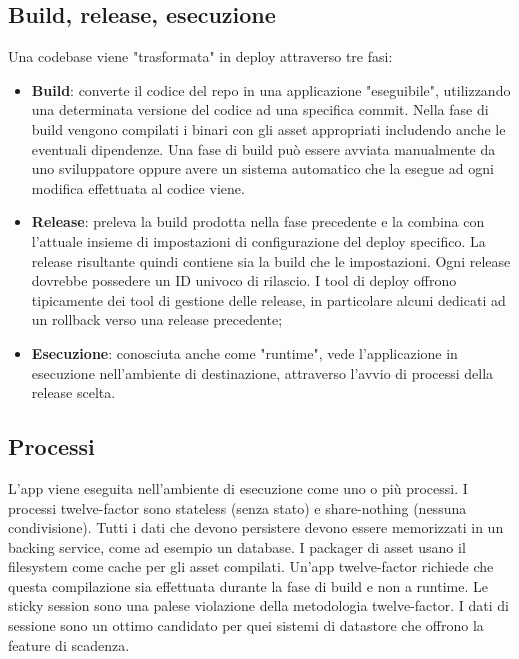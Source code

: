 \documentclass[PianoDiQualifica.tex]{subfiles}
\begin{document}
\subsection{Build, release, esecuzione}
Una codebase viene "trasformata" in deploy attraverso tre fasi:
\begin{itemize}
\item \textbf{Build}: converte il codice del repo in una applicazione "eseguibile", utilizzando una determinata versione del codice ad una specifica commit. Nella fase di build vengono compilati i binari con gli asset appropriati includendo anche le eventuali dipendenze. Una fase di build può essere avviata manualmente da uno sviluppatore oppure avere un sistema automatico che la esegue ad ogni modifica effettuata al codice viene.
\item \textbf{Release}: preleva la build prodotta nella fase precedente e la combina con l'attuale insieme di impostazioni di configurazione del deploy specifico. La release risultante quindi contiene sia la build che le impostazioni. Ogni release dovrebbe possedere un ID univoco di rilascio. I tool di deploy offrono tipicamente dei tool di gestione delle release, in particolare alcuni dedicati ad un rollback verso una release precedente;
\item \textbf{Esecuzione}: conosciuta anche come "runtime", vede l'applicazione in esecuzione nell'ambiente di destinazione, attraverso l'avvio di processi della release scelta.
\end{itemize}

\subsection{Processi}
L'app viene eseguita nell'ambiente di esecuzione come uno o più processi. I processi twelve-factor sono stateless (senza stato) e share-nothing (nessuna condivisione). Tutti i dati che devono persistere devono essere memorizzati in un backing service, come ad esempio un database.
I packager di asset usano il filesystem come cache per gli asset compilati. Un'app twelve-factor richiede che questa compilazione sia effettuata durante la fase di build e non a runtime.
Le sticky session sono una palese violazione della metodologia twelve-factor. I dati di sessione sono un ottimo candidato per quei sistemi di datastore che offrono la feature di scadenza.
\end{document}
